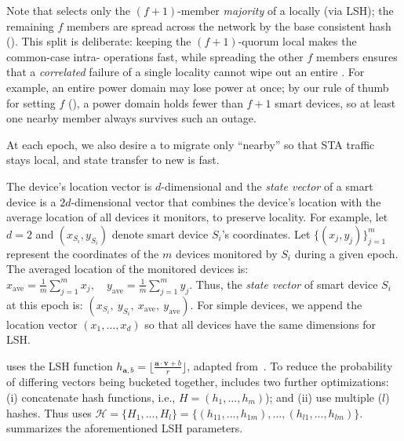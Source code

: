 Note that  selects only the $(f{+}1)$-member {\it majority} of a \kgroup{} locally (via LSH); the remaining $f$ members are spread across the network by the base consistent hash (). This split is deliberate: keeping the $(f{+}1)$-quorum local makes the common-case intra-\kgroup{} operations fast, while spreading the other $f$ members ensures that a {\it correlated} failure of a single locality cannot wipe out an entire \kgroup. For example, an entire power domain may lose power at once; by our rule of thumb for setting $f$ (), a power domain holds fewer than $f{+}1$ smart devices, so at least one nearby \kgroup{} member always survives such an outage.

At each epoch, we also desire a \kgroup{} to migrate only ``nearby'' so that STA traffic stays local, and state transfer to new \kgroup{} is fast.

The device's location vector is $d$-dimensional and the \textit{state vector} of a smart device is a $2d$-dimensional vector that combines the device's location with the average location of all devices it monitors, to preserve locality. 
For example, let $d = 2$ and $(x_{S_i}, y_{S_i})$ denote smart device $S_i$'s coordinates. Let $\{(x_j, y_j)\}_{j=1}^m$ represent the coordinates of the $m$ devices monitored by $S_i$ during a given epoch. The averaged location of the monitored devices is:
$ 
x_{\text{ave}} = \frac{1}{m} \sum_{j=1}^{m} x_j, \quad y_{\text{ave}} = \frac{1}{m} \sum_{j=1}^{m} y_j
$.
Thus, the \textit{state vector} of smart device $S_i$ at this epoch is:
$
(x_{S_i},\ y_{S_i},\ x_{\text{ave}},\ y_{\text{ave}})
$.
For simple devices, we append the location vector $(x_1, \dots, x_d)$ so that all devices have the same dimensions for LSH. 

\sysname{} uses the LSH function $h_{\bm{a},b} = \lfloor{ \frac{\bm{a}\cdot\bm{v}+b}{r}} \rfloor$, adapted from~\cite{datar_locality-sensitive_2004}.
To reduce the probability of differing vectors being bucketed together, \sysname{} includes two further optimizations: (i) concatenate hash functions, i.e., $H = (h_1, ..., h_m)$); and (ii) use multiple ($l$) hashes. Thus \sysname{} uses $\mathcal{H} = \{H_1,..., H_l\} =\{(h_{11}, ..., h_{1m}),..., (h_{l1}, ..., h_{lm})\}$.
 summarizes the aforementioned LSH parameters.

